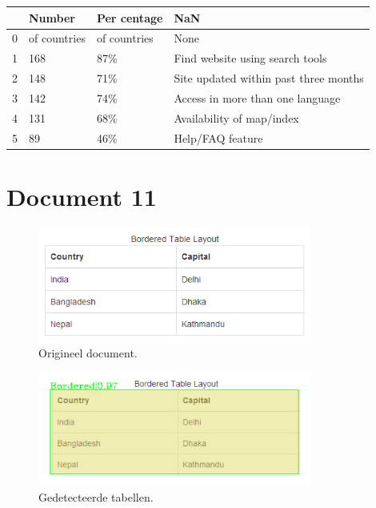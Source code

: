 \begin{tabular}{llll}
\toprule
{} &        Number &   Per centage &                                    NaN \\
\midrule
0 &  of countries &  of countries &                                   None \\
1 &           168 &           87\% &        Find website using search tools \\
2 &           148 &           71\% &  Site updated within past three months \\
3 &           142 &           74\% &       Access in more than one language \\
4 &           131 &           68\% &              Availability of map/index \\
5 &            89 &           46\% &                       Help/FAQ feature \\
\bottomrule
\end{tabular}
\section{Document 11}

\begin{figure}[H]
    \centering
    \includegraphics[width=0.8\textwidth]{test-resultaten/11/original.png}
    \caption{Origineel document.}
\end{figure}

\begin{figure}[H]
    \centering
    \includegraphics[width=0.8\textwidth]{test-resultaten/11/detected_tables.png}
    \caption{Gedetecteerde tabellen.}
\end{figure}

